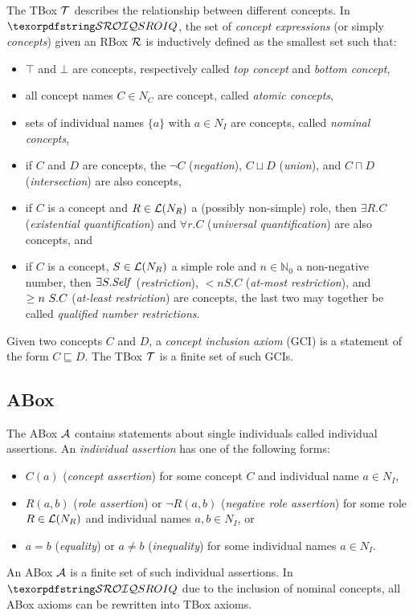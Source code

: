 The TBox $\mathcal{T}$ describes the relationship between different concepts. In $\SROIQ$, the set of \emph{concept expressions} (or simply \emph{concepts}) given an RBox $\mathcal{R}$ is inductively defined as the smallest set such that:
\begin{itemize}
  \item $\top$ and $\bot$ are concepts, respectively called \emph{top concept} and \emph{bottom concept},
  \item all concept names $C \in N_C$ are concept, called \emph{atomic concepts},
  \item sets of individual names $\{ a \}$ with $a \in N_I$ are concepts, called \emph{nominal concepts},
  \item if $C$ and $D$ are concepts, the $\lnot C$ (\emph{negation}), $C \sqcup D$ (\emph{union}), and $C \sqcap D$ (\emph{intersection}) are also concepts,
  \item if $C$ is a concept and $R \in \mathcal{L}(N_R)$ a (possibly non-simple) role, then $\exists R.C$ (\emph{existential quantification}) and $\forall r.C$ (\emph{universal quantification}) are also concepts, and
  \item if $C$ is a concept, $S \in \mathcal{L}(N_R)$ a simple role and $n \in \mathbb{N}_0$ a non-negative number, then $\exists S.\mathit{Self}$ (\emph{\self restriction}), $\less n S.C$ (\emph{at-most restriction}), and $\geq n~S.C$ (\emph{at-least restriction}) are concepts, the last two may together be called \emph{qualified number restrictions}.
\end{itemize}
Given two concepts $C$ and $D$, a \emph{concept inclusion axiom} (GCI) is a statement of the form $C \sqsubseteq D$. The TBox $\mathcal{T}$ is a finite set of such GCIs.

\subsection{ABox} \label{abox}

The ABox $\mathcal{A}$ contains statements about single individuals called individual assertions. An \emph{individual assertion} has one of the following forms:
\begin{itemize}
  \item $C(a)$ (\emph{concept assertion}) for some concept $C$ and individual name $a \in N_I$,
  \item $R(a, b)$ (\emph{role assertion}) or $\lnot R(a, b)$ (\emph{negative role assertion}) for some role $R \in \mathcal{L}(N_R)$ and individual names $a, b \in N_I$, or
  \item $a = b$ (\emph{equality}) or $a \not = b$ (\emph{inequality}) for some individual names $a \in N_I$.
\end{itemize}
An ABox $\mathcal{A}$ is a finite set of such individual assertions. In $\SROIQ$ due to the inclusion of nominal concepts, all ABox axioms can be rewritten into TBox axioms.
